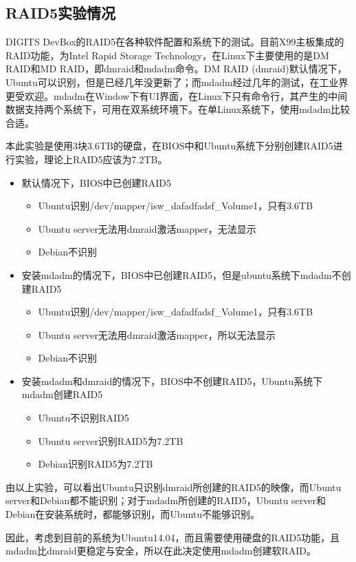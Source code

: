 \subsection{RAID5实验情况}
DIGITS DevBox的RAID5在各种软件配置和系统下的测试。目前X99主板集成的RAID功能，为Intel Rapid Storage Technology，在Linux下主要使用的是DM RAID和MD RAID，即dmraid和mdadm命令。DM RAID (dmraid)默认情况下，Ubuntu可以识别，但是已经几年没更新了；而mdadm经过几年的测试，在工业界更受欢迎。mdadm在Window下有UI界面，在Linux下只有命令行，其产生的中间数据支持两个系统下，可用在双系统环境下。在单Linux系统下，使用mdadm比较合适。

本此实验是使用3块3.6TB的硬盘，在BIOS中和Ubuntu系统下分别创建RAID5进行实验，理论上RAID5应该为7.2TB。
\begin{itemize}
\item 默认情况下，BIOS中已创建RAID5
	\begin{itemize}
	\item Ubuntu识别/dev/mapper/isw\_dafadfadsf\_Volume1，只有3.6TB 
	\item Ubuntu server无法用dmraid激活mapper，无法显示
	\item Debian不识别
	\end{itemize}
\item 安装mdadm的情况下，BIOS中已创建RAID5，但是ubuntu系统下mdadm不创建RAID5
	\begin{itemize}
	\item Ubuntu识别/dev/mapper/isw\_dafadfadsf\_Volume1，只有3.6TB 
	\item Ubuntu server无法用dmraid激活mapper，所以无法显示
	\item Debian不识别
	\end{itemize}
\item 安装mdadm和dmraid的情况下，BIOS中不创建RAID5，Ubuntu系统下mdadm创建RAID5
	\begin{itemize}
	\item Ubuntu不识别RAID5
	\item Ubuntu server识别RAID5为7.2TB
	\item Debian识别RAID5为7.2TB
	\end{itemize}
\end{itemize}
由以上实验，可以看出Ubuntu只识别dmraid所创建的RAID5的映像，而Ubuntu server和Debian都不能识别；对于mdadm所创建的RAID5，Ubuntu server和Debian在安装系统时，都能够识别，而Ubuntu不能够识别。

因此，考虑到目前的系统为Ubuntu14.04，而且需要使用硬盘的RAID5功能，且mdadm比dmraid更稳定与安全，所以在此决定使用mdadm创建软RAID。

